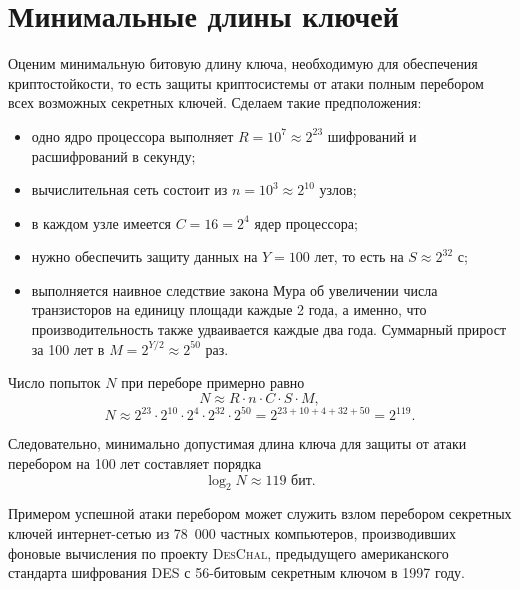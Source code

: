 \section{Минимальные длины ключей}

Оценим минимальную битовую длину ключа, необходимую для обеспечения криптостойкости, то есть защиты криптосистемы от атаки полным перебором всех возможных секретных ключей. Сделаем такие предположения:

\begin{itemize}
    \item одно ядро процессора выполняет $R = 10^7 \approx 2^{23}$ шифрований и расшифрований в секунду;
    \item вычислительная сеть состоит из $n = 10^3 \approx 2^{10}$ узлов;
    \item в каждом узле имеется $C = 16 = 2^4$ ядер процессора;
    \item нужно обеспечить защиту данных на $Y = 100$ лет, то есть на $S \approx 2^{32}$ с;
    \item выполняется наивное следствие закона Мура об увеличении числа транзисторов на единицу площади каждые 2 года, а именно, что производительность также удваивается каждые два года. Суммарный прирост за 100 лет в $M = 2^{Y/2} \approx 2^{50}$ раз.
\end{itemize}

Число попыток $N$ при переборе примерно равно
    \[ N \approx R \cdot n \cdot C \cdot S \cdot M, \]
    \[ N \approx 2^{23} \cdot 2^{10} \cdot 2^{4} \cdot 2^{32} \cdot 2^{50} = 2^{23+10+4+32+50} = 2^{119}. \]

Следовательно, минимально допустимая длина ключа для защиты от атаки перебором на 100 лет составляет порядка
    \[ \log_2 N \approx 119\text{ бит}. \]

Примером успешной атаки перебором может служить взлом перебором секретных ключей интернет-сетью из 78~000 частных компьютеров, производивших фоновые вычисления по проекту \textsc{DesChal}, предыдущего американского стандарта шифрования DES с 56-битовым секретным ключом в 1997 году.
